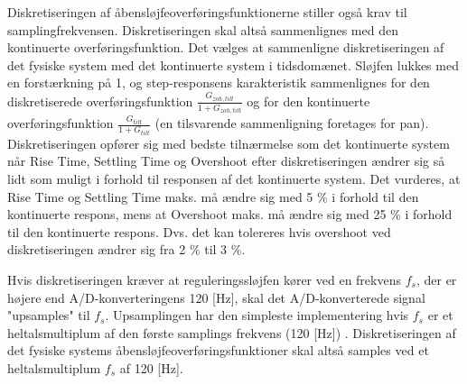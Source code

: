 Diskretiseringen af åbensløjfeoverføringsfunktionerne stiller også krav til samplingfrekvensen.
Diskretiseringen skal altså sammenlignes med den kontinuerte overføringsfunktion.
Det vælges at sammenligne diskretiseringen af det fysiske system med det kontinuerte system i tidsdomænet.
Sløjfen lukkes med en forstærkning på 1, og step-responsens karakteristik sammenlignes
for den diskretiserede overføringsfunktion \(\frac{G_{zoh,tilt}}{1+G_{zoh,tilt}}\)
og for den kontinuerte overføringsfunktion \(\frac{G_{tilt}}{1+G_{tilt}}\) (en tilsvarende sammenligning foretages for pan).
Diskretiseringen opfører sig med bedste tilnærmelse som det kontinuerte system
når Rise Time, Settling Time og Overshoot efter diskretiseringen
ændrer sig så lidt som muligt i forhold til responsen af det kontinuerte system.
Det vurderes, at Rise Time og Settling Time maks. må ændre sig med 5 \% i forhold
til den kontinuerte respons, mens at Overshoot maks. må ændre sig med 25 \% i forhold til
den kontinuerte respons.
Dvs. det kan tolereres hvis overshoot
ved diskretiseringen ændrer sig fra 2 \% til 3 \%.

Hvis diskretiseringen kræver at reguleringssløjfen kører ved en frekvens \(f_s\),
der er højere end A/D-konverteringens 120 [Hz], skal det A/D-konverterede
signal "upsamples" til \(f_s\).
Upsamplingen har den simpleste implementering
hvis \(f_s\) er et heltalsmultiplum af den første samplings frekvens (120 [Hz]) \citep[s. 562]{dsp}.
Diskretiseringen af det fysiske systems åbensløjfeoverføringsfunktioner skal altså samples ved et heltalsmultiplum \(f_s\) af 120 [Hz].

